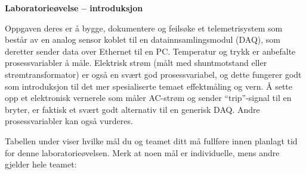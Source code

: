 
\noindent
{\bf Laboratorieøvelse -- introduksjon}

\vskip 5pt

Oppgaven deres er å bygge, dokumentere og feilsøke et telemetrisystem som består av en analog sensor koblet til en datainnsamlingsmodul (DAQ), som deretter sender data over Ethernet til en PC. Temperatur og trykk er anbefalte prosessvariabler å måle. Elektrisk strøm (målt med shuntmotstand eller strømtransformator) er også en svært god prosessvariabel, og dette fungerer godt som introduksjon til det mer spesialiserte temaet effektmåling og vern. Å sette opp et elektronisk vernerele som måler AC-strøm og sender ``trip''-signal til en bryter, er faktisk et svært godt alternativ til en generisk DAQ. Andre prosessvariabler kan også vurderes.

Tabellen under viser hvilke mål du og teamet ditt må fullføre innen planlagt tid for denne laboratorieøvelsen. Merk at noen mål er individuelle, mens andre gjelder hele teamet:



